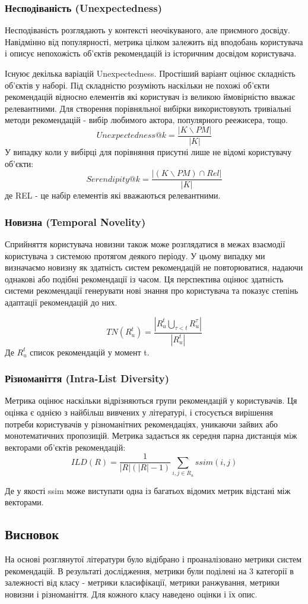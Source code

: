 \subsubsection{Несподіваність (Unexpectedness)}

Несподіваність розглядають у контексті неочікуваного, але приємного досвіду.
Навідмінно від популярності, метрика цілком залежить від вподобань користувача і описує непохожість об’єктів рекомендацій із історичним досвідом користувача.

Існуює декілька варіацій Unexpectedness. Простіший варіант оцінює складність об’єктів у наборі. Під складністю розуміють наскільки не похожі об’єкти рекомендацій відносно елементів які користувач із великою ймовірністю вважає релевантними. Для створення порівняльної вибірки використовують тривіальні методи рекомендацій - вибір любимого актора, популярного реежисера, тощо.  
\[Unexpectedness@k = \frac{|K \backslash  PM|}{|K|}\]
У випадку коли у вибірці для порівняння присутні лише не відомі користувачу об’єкти: 
\[Serendipity@k = \frac{|(K \backslash  PM) \cap Rel|}{|K|}\]
де REL - це набір елементів які вважаються релевантними.
\subsubsection{Новизна (Temporal Novelity)}
Сприйняття користувача новизни також може розглядатися в межах взаємодії користувача з системою протягом деякого періоду. У цьому випадку ми визначаємо новизну як здатність систем рекомендацій не повторюватися, надаючи однакові або подібні рекомендації із часом. Ця перспектива оцінює здатність системи рекомендації генерувати нові знання про користувача та показує степінь адаптації рекомендацій до них.

\[ TN(R_u^{t}) = \frac {|R_u^{t} \bigcup_{\tau < t} R^{\tau}_u|} {|R^{t}_u|}\]
Де $R_u^{t}$ список рекомендацій у момент t.
\subsubsection{Різноманіття (Intra-List Diversity)}
Метрика оцінює наскільки відрізняються групи рекомендацій у користувачів. 
Ця оцінка є однією з найбільш вивчених у літературі, і стосується вирішення потреби користувачів у різноманітних рекомендаціях, уникаючи зайвих або монотематичних пропозицій. Метрика задається як середня парна дистанція між векторами об’єктів рекомендацій:
\[ ILD(R) = \frac{1}{|R|(|R| - 1)} \sum_{i,j \in R_u }ssim(i,j)\]  

Де у якості ssim може виступати одна із багатьох відомих метрик відстані між векторами.
\subsection*{Висновок}
На основі розглянутої літератури було відібрано і проаналізовано метрики систем рекомендацій. В результаті дослідження, метрики були поділені на 3 категорії в залежності від класу - метрики класифікації, метрики ранжування, метрики новизни і різноманіття. Для кожного класу наведено оцінки і їх опис.
